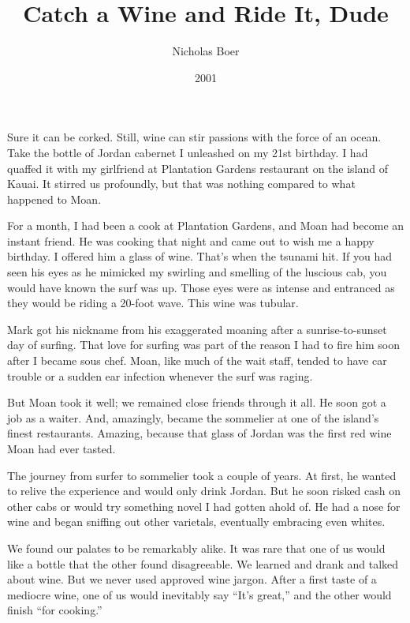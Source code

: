 \documentclass[12pt]{article}
\title{Catch a Wine and Ride It, Dude}
\author{Nicholas Boer}
\date{2001}
\begin{document}

\maketitle

Sure it can be corked.
Still, wine can stir passions with the force of an ocean.
Take the bottle of Jordan cabernet I unleashed on my 21st birthday.
I had quaffed it with my girlfriend at Plantation Gardens restaurant on the island of Kauai.
It stirred us profoundly, but that was nothing compared to what happened to Moan.

For a month, I had been a cook at Plantation Gardens, and Moan had become an instant friend.
He was cooking that night and came out to wish me a happy birthday.
I offered him a glass of wine.
That's when the tsunami hit.
If you had seen his eyes as he mimicked my swirling and smelling of the luscious cab, you would have known the surf was up.
Those eyes were as intense and entranced as they would be riding a 20-foot wave.
This wine was tubular.

Mark got his nickname from his exaggerated moaning after a sunrise-to-sunset day of surfing.
That love for surfing was part of the reason I had to fire him soon after I became sous chef.
Moan, like much of the wait staff, tended to have car trouble or a sudden ear infection whenever the surf was raging.

But Moan took it well; we remained close friends through it all.
He soon got a job as a waiter.
And, amazingly, became the sommelier at one of the island's finest restaurants.
Amazing, because that glass of Jordan was the first red wine Moan had ever tasted.

The journey from surfer to sommelier took a couple of years.
At first, he wanted to relive the experience and would only drink Jordan.
But he soon risked cash on other cabs or would try something novel I had gotten ahold of.
He had a nose for wine and began sniffing out other varietals, eventually embracing even whites.

We found our palates to be remarkably alike.
It was rare that one of us would like a bottle that the other found disagreeable.
We learned and drank and talked about wine.
But we never used approved wine jargon.
After a first taste of a mediocre wine, one of us would inevitably say ``It's great,'' and the other would finish ``for cooking.''
\end{document}

